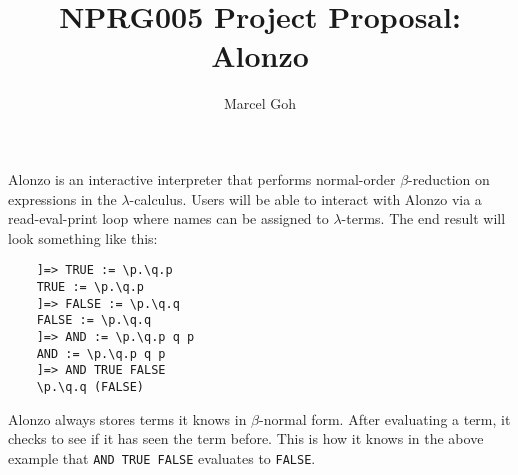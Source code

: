 \documentclass[11pt]{article}
\begin{document}
 
\title{\textbf{NPRG005 Project Proposal: Alonzo}}
\author{Marcel Goh}
\maketitle

Alonzo is an interactive interpreter that performs normal-order $\beta$-reduction on expressions in the $\lambda$-calculus. Users will be able to interact with Alonzo via a read-eval-print loop where names can be assigned to $\lambda$-terms. The end result will look something like this:

\begin{lstlisting}
    ]=> TRUE := \p.\q.p
    TRUE := \p.\q.p
    ]=> FALSE := \p.\q.q
    FALSE := \p.\q.q
    ]=> AND := \p.\q.p q p
    AND := \p.\q.p q p
    ]=> AND TRUE FALSE
    \p.\q.q (FALSE)
\end{lstlisting}

Alonzo always stores terms it knows in $\beta$-normal form. After evaluating a term, it checks to see if it has seen the term before. This is how it knows in the above example that \texttt{AND TRUE FALSE} evaluates to \texttt{FALSE}.
\end{document}

